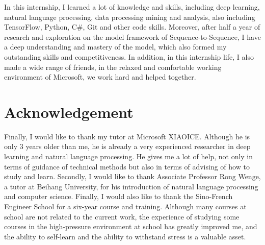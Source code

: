 \documentclass[12pt,a4paper]{article}
\begin{document}
In this internship, I learned a lot of knowledge and skills, including deep learning, natural language processing, data processing mining and analysis, also including TensorFlow, Python, C$\#$, Git and other code skills. Moreover, after half a year of research and exploration on the model framework of Sequence-to-Sequence, I have a deep understanding and mastery of the model, which also formed my outstanding skills and competitiveness. In addition, in this internship life, I also made a wide range of friends, in the relaxed and comfortable working environment of Microsoft, we work hard and helped together.

\section{Acknowledgement}
Finally, I would like to thank my tutor at Microsoft XIAOICE. Although he is only 3 years older than me, he is already a very experienced researcher in deep learning and natural language processing. He gives me a lot of help, not only in terms of guidance of technical methods but also in terms of advising of how to study and learn. Secondly, I would like to thank Associate Professor Rong Wenge, a tutor at Beihang University, for his introduction of natural language processing and computer science. Finally, I would also like to thank the Sino-French Engineer School for a six-year course and training. Although many courses at school are not related to the current work, the experience of studying some courses in the high-pressure environment at school has greatly improved me, and the ability to self-learn and the ability to withstand stress is a valuable asset.


\newpage

\end{document}
